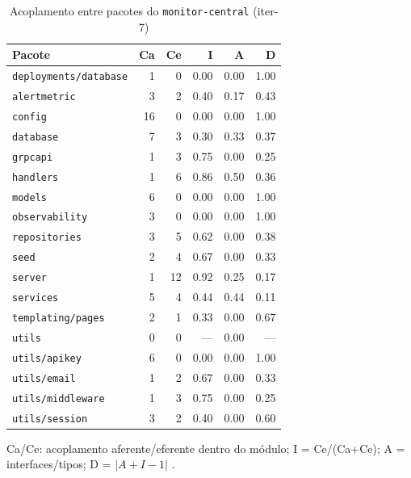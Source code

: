 \begin{table}[htbp]
  \centering\small
  \caption{Acoplamento entre pacotes do \texttt{monitor-central} (iter-7)}
  \label{tab:iter-7-acoplamento-central}
  \begin{tabular}{lrrrrr}
    \toprule
    Pacote & Ca & Ce & I & A & D \\
    \midrule
    \texttt{deployments/database} & 1 & 0 & 0.00 & 0.00 & 1.00 \\
    \texttt{alertmetric} & 3 & 2 & 0.40 & 0.17 & 0.43 \\
    \texttt{config} & 16 & 0 & 0.00 & 0.00 & 1.00 \\
    \texttt{database} & 7 & 3 & 0.30 & 0.33 & 0.37 \\
    \texttt{grpcapi} & 1 & 3 & 0.75 & 0.00 & 0.25 \\
    \texttt{handlers} & 1 & 6 & 0.86 & 0.50 & 0.36 \\
    \texttt{models} & 6 & 0 & 0.00 & 0.00 & 1.00 \\
    \texttt{observability} & 3 & 0 & 0.00 & 0.00 & 1.00 \\
    \texttt{repositories} & 3 & 5 & 0.62 & 0.00 & 0.38 \\
    \texttt{seed} & 2 & 4 & 0.67 & 0.00 & 0.33 \\
    \texttt{server} & 1 & 12 & 0.92 & 0.25 & 0.17 \\
    \texttt{services} & 5 & 4 & 0.44 & 0.44 & 0.11 \\
    \texttt{templating/pages} & 2 & 1 & 0.33 & 0.00 & 0.67 \\
    \texttt{utils} & 0 & 0 & --- & 0.00 & --- \\
    \texttt{utils/apikey} & 6 & 0 & 0.00 & 0.00 & 1.00 \\
    \texttt{utils/email} & 1 & 2 & 0.67 & 0.00 & 0.33 \\
    \texttt{utils/middleware} & 1 & 3 & 0.75 & 0.00 & 0.25 \\
    \texttt{utils/session} & 3 & 2 & 0.40 & 0.00 & 0.60 \\
    \bottomrule
  \end{tabular}
  \par\smallskip\footnotesize Ca/Ce: acoplamento aferente/eferente dentro do módulo; I = Ce/(Ca+Ce); A = interfaces/tipos; D = $|A+I-1|$ \cite{martin2002}.
\end{table}

